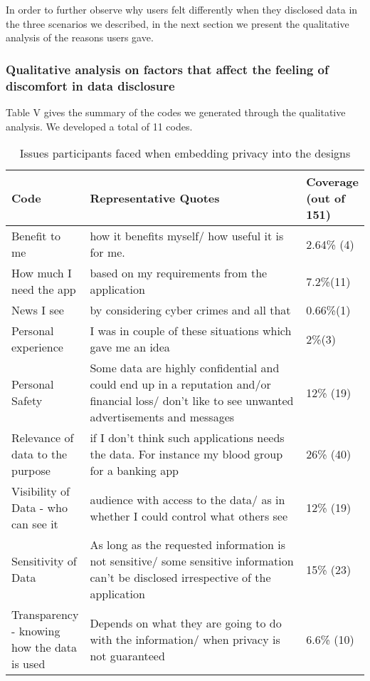 \documentclass[10pt]{article}
\begin{document}
In order to further observe why users felt differently when they disclosed data in the three scenarios we described, in the next section we present the qualitative analysis of the reasons users gave.

\subsubsection{Qualitative analysis on factors that affect the feeling of discomfort in data disclosure}

Table V gives the summary of the codes we generated through the qualitative analysis. We developed a total of 11 codes.

\begin{center}
\begin{table*}[htbp]
\caption{Issues participants faced when embedding privacy into the designs}
\begin{center}
\begin{adjustbox}{width=1\textwidth}
\begin{tabular}{|p{0.20\linewidth}|p{0.64\linewidth}|p{0.16\linewidth}|}
\hline
Code &  Representative Quotes & Coverage (out of 151)\\
\hline
Benefit to me &how it benefits myself/ how useful it is for me. & 2.64\% (4)\\
\hline
How much I need the app &  based on my requirements from the application & 7.2\%(11)\\
\hline
News I see  & by considering cyber crimes and all that & 0.66\%(1) \\
\hline
Personal experience &  I was in couple of these situations which gave me an idea & 2\%(3) \\
\hline
Personal Safety & Some data are highly confidential and could end up in a reputation and/or financial loss/  don't like to see unwanted advertisements and messages & 12\% (19)\\ 
\hline
Relevance of data to the purpose &if I don't think such applications needs the data. For instance my blood group for a banking app
 & 26\% (40)\\ 
\hline
Visibility of Data - who can see it & audience with access to the data/ as in whether I could control what others see & 12\% (19)\\ 
\hline
Sensitivity of Data & As long as the requested information is not sensitive/  some sensitive information can't be disclosed irrespective of the application
 & 15\% (23)\\ 
\hline
Transparency - knowing how the data is used & Depends on what they are going to do with the information/ when privacy is not guaranteed & 6.6\% (10)\\ 

\end{tabular}
\end{adjustbox}
\end{center}
\end{table*}
\end{center}
\end{document}
